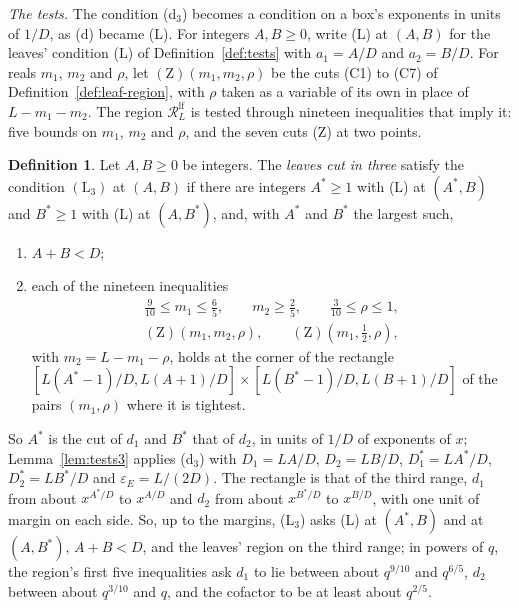 \documentclass[11pt]{article}
\theoremstyle{definition}
\newtheorem{definition}[theorem]{Definition}
\begin{document}
\emph{The tests.} The condition (d$_3$) becomes a condition on a box's exponents in units of $1/D$, as (d) became
(L). For integers $A, B \ge 0$, write (L) at $(A, B)$ for the leaves' condition (L) of Definition~\ref{def:tests} with
$a_1 = A/D$ and $a_2 = B/D$. For reals $m_1$, $m_2$ and $\rho$, let $(\mathrm Z)(m_1, m_2, \rho)$ be the cuts (C1) to
(C7) of Definition~\ref{def:leaf-region}, with $\rho$ taken as a variable of its own in place of $L - m_1 - m_2$. The
region $\mathcal R^{\mathrm{lf}}_L$ is tested through nineteen inequalities that imply it: five bounds on $m_1$, $m_2$
and $\rho$, and the seven cuts (Z) at two points.

\begin{definition}\label{def:leaves3}
Let $A, B \ge 0$ be integers. The \emph{leaves cut in three} satisfy the condition $(\mathrm L_3)$ at $(A, B)$ if there
are integers $A^* \ge 1$ with (L) at $(A^*, B)$ and $B^* \ge 1$ with (L) at $(A, B^*)$, and, with $A^*$ and $B^*$ the
largest such,
\begin{enumerate}
\item[(i)] $A + B < D$;
\item[(ii)] each of the nineteen inequalities
  \begin{gather*}
    \tfrac9{10} \le m_1 \le \tfrac65, \qquad m_2 \ge \tfrac25, \qquad \tfrac3{10} \le \rho \le 1, \\
    (\mathrm Z)(m_1, m_2, \rho), \qquad (\mathrm Z)(m_1, \tfrac12, \rho),
  \end{gather*}
  with $m_2 = L - m_1 - \rho$, holds at the corner of the rectangle $[L(A^* - 1)/D, L(A + 1)/D] \times [L(B^* - 1)/D,
  L(B + 1)/D]$ of the pairs $(m_1, \rho)$ where it is tightest.
\end{enumerate}
\end{definition}

So $A^*$ is the cut of $d_1$ and $B^*$ that of $d_2$, in units of $1/D$ of exponents of $x$; Lemma~\ref{lem:tests3}
applies (d$_3$) with $D_1 = LA/D$, $D_2 = LB/D$, $D_1^* = LA^*/D$, $D_2^* = LB^*/D$ and $\varepsilon_E = L/(2D)$. The
rectangle is that of the third range, $d_1$ from about $x^{A^*/D}$ to $x^{A/D}$ and $d_2$ from about $x^{B^*/D}$ to
$x^{B/D}$, with one unit of margin on each side. So, up to the margins, (L$_3$) asks (L) at $(A^*, B)$ and at $(A,
B^*)$, $A + B < D$, and the leaves' region on the third range; in powers of $q$, the region's first five inequalities
ask $d_1$ to lie between about $q^{9/10}$ and $q^{6/5}$, $d_2$ between about $q^{3/10}$ and $q$, and the cofactor to be
at least about $q^{2/5}$.
\end{document}
